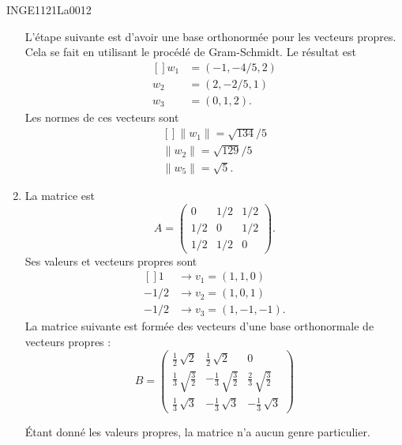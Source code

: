 \begin{corrige}{INGE1121La0012}
\begin{enumerate}
		L'étape suivante est d'avoir une base orthonormée pour les vecteurs propres. Cela se fait en utilisant le procédé de Gram-Schmidt. Le résultat est
		\begin{equation}
			\begin{aligned}[]
				w_1&=(-1,-4/5,2)\\
				w_2&=(2,-2/5,1)\\
				w_3&=(0,1,2).
			\end{aligned}
		\end{equation}
		Les normes de ces vecteurs sont 
		\begin{equation}
			\begin{aligned}[]
				\| w_1 \|=\sqrt{134}/5\\
				\| w_2 \|=\sqrt{129}/5\\
				\| w_5 \|=\sqrt{5}.
			\end{aligned}
		\end{equation}
	
	\item
		La matrice est
		\begin{equation}
			A=
			\begin{pmatrix}
				0	&	1/2	&	1/2	\\
				1/2	&	0	&	1/2	\\
				1/2	&	1/2	&	0
			\end{pmatrix}.
		\end{equation}
		Ses valeurs et vecteurs propres sont
		\begin{equation}
			\begin{aligned}[]
				1&\to v_1=(1, 1, 0)\\
				-1/2&\to v_2=(1, 0, 1)\\
				-1/2&\to v_3=(1, -1, -1).
			\end{aligned}
		\end{equation}
		La matrice suivante est formée des vecteurs d'une base orthonormale de vecteurs propres :
		\begin{equation}
			B=
			\begin{pmatrix}
				\frac{1}{2} \, \sqrt{2} & \frac{1}{2} \, \sqrt{2} & 0 \\
				\frac{1}{3} \, \sqrt{\frac{3}{2}} & -\frac{1}{3} \, \sqrt{\frac{3}{2}} & \frac{2}{3} \, \sqrt{\frac{3}{2}} \\
				\frac{1}{3} \, \sqrt{3} & -\frac{1}{3} \, \sqrt{3} & -\frac{1}{3} \, \sqrt{3}
			\end{pmatrix}
		\end{equation}

		Étant donné les valeurs propres, la matrice n'a aucun genre particulier.
		

	\end{enumerate}

\end{corrige}
